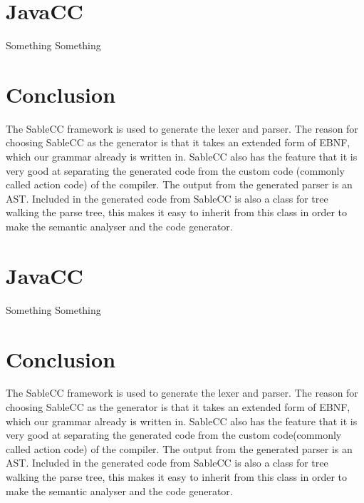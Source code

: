 \section{JavaCC}
Something Something

\section{Conclusion}
The SableCC framework is used to generate the lexer and parser. The reason for choosing SableCC as the generator is that it takes an extended form of EBNF, which our grammar already is written in. SableCC also has the feature that it is very good at separating the generated code from the custom code (commonly called action code) of the compiler. The output from the generated parser is an AST. Included in the generated code from SableCC is also a class for tree walking the parse tree, this makes it easy to inherit from this class in order to make the semantic analyser and the code generator.

\section{JavaCC}
Something Something

\section{Conclusion}
The SableCC framework is used to generate the lexer and parser. The reason for choosing SableCC as the generator is that it takes an extended form of EBNF, which our grammar already is written in. SableCC also has the feature that it is very good at separating the generated code from the custom code(commonly called action code) of the compiler. The output from the generated parser is an AST. Included in the generated code from SableCC is also a class for tree walking the parse tree, this makes it easy to inherit  from this class in order to make the semantic analyser and the code generator.